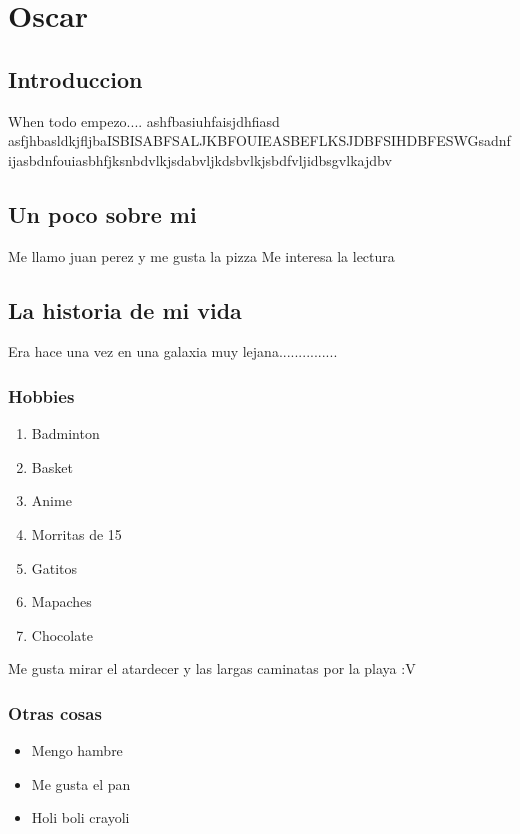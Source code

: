 \chapter{Oscar}

\section{Introduccion}
When todo empezo.... 
ashfbasiuhfaisjdhfiasd
asfjhbasldkjfljbaISBISABFSALJKBFOUIEASBEFLKSJDBFSIHDBFESWGsadnfijasbdnfouiasbhfjksnbdvlkjsdabvljkdsbvlkjsbdfvljidbsgvlkajdbv

\section{Un poco sobre mi}
Me llamo juan perez y me gusta la pizza
Me interesa la lectura ~\cite{guerra,hombre,ensayo,orwel,huxley}

\section{La historia de mi vida}
Era hace una vez en una galaxia muy lejana............... 

\subsection{Hobbies}
\begin{enumerate}
\item Badminton
\item Basket
\item Anime
\item Morritas de 15
\item Gatitos
\item Mapaches
\item Chocolate
\end{enumerate}
Me gusta mirar el atardecer y las largas caminatas por la playa :V

\subsection{Otras cosas}
\begin{itemize}
\item Mengo hambre
\item Me gusta el pan
\item Holi boli crayoli
\end{itemize}

